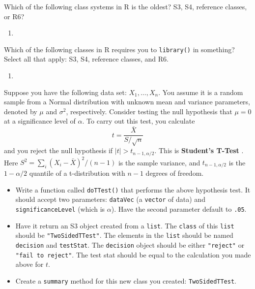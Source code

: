 \documentclass[
  12pt,
  krantz2]{krantz}
\providecommand{\tightlist}{%
  \setlength{\itemsep}{0pt}\setlength{\parskip}{0pt}}
\begin{document}
Which of the following class systems in R is the oldest? S3, S4, reference classes, or R6?

\begin{enumerate}
\def\labelenumi{\arabic{enumi}.}
\setcounter{enumi}{7}
\tightlist
\item
\end{enumerate}

Which of the following classes in R requires you to \texttt{library()} in something? Select all that apply: S3, S4, reference classes, and R6.

\begin{enumerate}
\def\labelenumi{\arabic{enumi}.}
\setcounter{enumi}{8}
\tightlist
\item
\end{enumerate}

Suppose you have the following data set: \(X_1, \ldots, X_n\). You assume it is a random sample from a Normal distribution with unknown mean and variance parameters, denoted by \(\mu\) and \(\sigma^2\), respectively. Consider testing the null hypothesis that \(\mu = 0\) at a significance level of \(\alpha\). To carry out this test, you calculate
\begin{equation} 
t = \frac{\bar{X}}{S/\sqrt{n}}
\end{equation}
and you reject the null hypothesis if \(|t| > t_{n-1,\alpha/2}\). This is \textbf{Student's T-Test} \citep{student1908probable}. Here \(S^2 = \sum_i(X_i - \bar{X})^2 / (n-1)\) is the sample variance, and \(t_{n-1,\alpha/2}\) is the \(1-\alpha/2\) quantile of a t-distribution with \(n-1\) degrees of freedom.

\begin{itemize}
\tightlist
\item
  Write a function called \texttt{doTTest()} that performs the above hypothesis test. It should accept two parameters: \texttt{dataVec} (a \texttt{vector} of data) and \texttt{significanceLevel} (which is \(\alpha\)). Have the second parameter default to \texttt{.05}.
\item
  Have it return an S3 object created from a \texttt{list}. The \texttt{class} of this \texttt{list} should be \texttt{"TwoSidedTTest"}. The elements in the \texttt{list} should be named \texttt{decision} and \texttt{testStat}. The \texttt{decision} object should be either \texttt{"reject"} or \texttt{"fail\ to\ reject"}. The test stat should be equal to the calculation you made above for \(t\).
\item
  Create a \texttt{summary} method for this new class you created: \texttt{TwoSidedTTest}.
\end{itemize}
\end{document}
